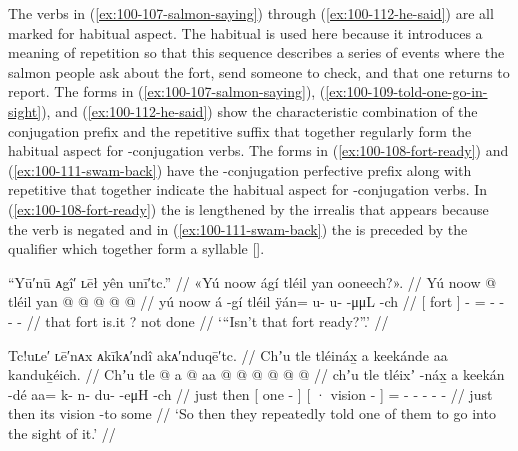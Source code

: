 The verbs in (\ref{ex:100-107-salmon-saying}) through (\ref{ex:100-112-he-said}) are all marked for habitual aspect.
The habitual is used here because it introduces a meaning of repetition so that this sequence describes a series of events where the salmon people ask about the fort, send someone to check, and that one returns to report.
The forms in (\ref{ex:100-107-salmon-saying}), (\ref{ex:100-109-told-one-go-in-sight}), and (\ref{ex:100-112-he-said}) show the characteristic combination of the  conjugation prefix and the  repetitive suffix that together regularly form the habitual aspect for -conjugation verbs.
The forms in (\ref{ex:100-108-fort-ready}) and (\ref{ex:100-111-swam-back}) have the -conjugation perfective prefix  along with repetitive  that together indicate the habitual aspect for -conjugation verbs.
In (\ref{ex:100-108-fort-ready}) the  is lengthened by the irrealis  that appears because the verb is negated and in (\ref{ex:100-111-swam-back}) the  is preceded by the qualifier  which together form a syllable  [].

\clearpage
\ex\label{ex:100-108-fort-ready}%
%
\begingl
	\glpreamble	“Yū′nū ᴀgî′ ʟēł yên unī′tc.” //
	\glpreamble	«\!Yú noow ágí tléil yan ooneech?\!». //
	\gla	{} Yú noow {}  @ {}
		tléil yan @  @ {} @ {} @ {} @ {} //
	\glb	{} yú noow {} á -gí 
		tléil ÿán= u- u-  -μμL -ch //
	\glc	{}[  fort {}]  - 
		 = - -  - - //
	\gld	{} that fort {} is.it \·?
		not done  {} {} {} {} //
	\glft	‘“Isn’t that fort ready?”.’
		//
\endgl
\xe

\ex\label{ex:100-109-told-one-go-in-sight}%
%
\begingl
	\glpreamble	Tc!uʟe′ ʟē′nᴀx ᴀkīkᴀ′ndî akᴀ′nduqē′tc. //
	\glpreamble	Chʼu tle tléináx̱ a keekánde aa kanduḵéich. //
	\gla	Chʼu tle {}  @ {} {} 
		{} a  @ {} {}
		aa @  @ {} @ {} @ {} @ {} @ {} //
	\glb	chʼu tle {} tléixʼ -náx̱ {} 
		{} a keekán -dé {}
		aa= k- n- du-  -eμH -ch //
	\glc	just then {}[ one - {}]
		{}[ · vision - {}]
		= - - -  - - //
	\gld	just then {}  {} {} 
		{} its vision -to {}
		some  {} {} {} {} {} //
	\glft	‘So then they repeatedly told one of them to go into the sight of it.’
		//
\endgl
\xe


